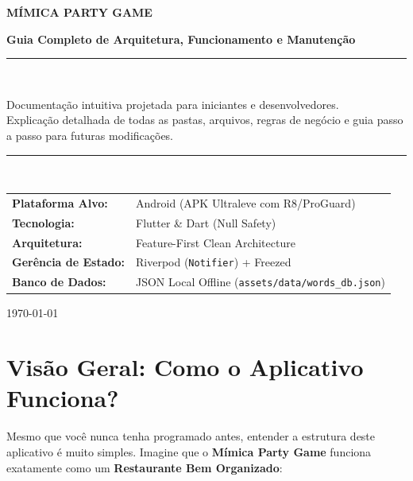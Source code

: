 \documentclass[12pt,a4paper]{article}
\begin{document}
\begin{titlepage}
  \centering
  \vspace*{2cm}
  {\Huge\bfseries\color{PrimaryPurple} MÍMICA PARTY GAME\par}
  \vspace{0.4cm}
  {\Large\bfseries Guia Completo de Arquitetura, Funcionamento e Manutenção\par}
  \vspace{1.5cm}
  \rule{\linewidth}{0.5mm} \\[0.4cm]
  {\large Documentação intuitiva projetada para iniciantes e desenvolvedores.\\
  Explicação detalhada de todas as pastas, arquivos, regras de negócio e guia passo a passo para futuras modificações.\par}
  \rule{\linewidth}{0.5mm} \\[2cm]

  \begin{tabular}{ll}
    \textbf{Plataforma Alvo:} & Android (APK Ultraleve com R8/ProGuard) \\
    \textbf{Tecnologia:} & Flutter \& Dart (Null Safety) \\
    \textbf{Arquitetura:} & Feature-First Clean Architecture \\
    \textbf{Gerência de Estado:} & Riverpod (\texttt{Notifier}) + Freezed \\
    \textbf{Banco de Dados:} & JSON Local Offline (\texttt{assets/data/words\_db.json}) \\
  \end{tabular}

  \vfill
  {\large \today\par}
\end{titlepage}

\tableofcontents
\newpage

\section{Visão Geral: Como o Aplicativo Funciona?}

Mesmo que você nunca tenha programado antes, entender a estrutura deste aplicativo é muito simples. Imagine que o \textbf{Mímica Party Game} funciona exatamente como um \textbf{Restaurante Bem Organizado}:
\end{document}
